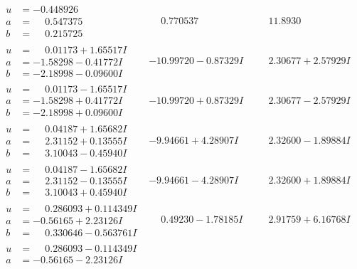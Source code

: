 \documentclass[1p]{elsarticle_modified}
\theoremstyle{definition}
\begin{document}
$$\begin{array}{c|c|c}
\begin{aligned}
u &= -0.448926\phantom{ +0.000000I} \\
a &= \phantom{-}0.547375\phantom{ +0.000000I} \\
b &= \phantom{-}0.215725\phantom{ +0.000000I}\end{aligned}
 & \phantom{-}0.770537\phantom{ +0.000000I} & \phantom{-}11.8930\phantom{ +0.000000I} \\ \hline\begin{aligned}
u &= \phantom{-}0.01173 + 1.65517 I \\
a &= -1.58298 - 0.41772 I \\
b &= -2.18998 - 0.09600 I\end{aligned}
 & -10.99720 - 0.87329 I & \phantom{-}2.30677 + 2.57929 I \\ \hline\begin{aligned}
u &= \phantom{-}0.01173 - 1.65517 I \\
a &= -1.58298 + 0.41772 I \\
b &= -2.18998 + 0.09600 I\end{aligned}
 & -10.99720 + 0.87329 I & \phantom{-}2.30677 - 2.57929 I \\ \hline\begin{aligned}
u &= \phantom{-}0.04187 + 1.65682 I \\
a &= \phantom{-}2.31152 + 0.13555 I \\
b &= \phantom{-}3.10043 - 0.45940 I\end{aligned}
 & -9.94661 + 4.28907 I & \phantom{-}2.32600 - 1.89884 I \\ \hline\begin{aligned}
u &= \phantom{-}0.04187 - 1.65682 I \\
a &= \phantom{-}2.31152 - 0.13555 I \\
b &= \phantom{-}3.10043 + 0.45940 I\end{aligned}
 & -9.94661 - 4.28907 I & \phantom{-}2.32600 + 1.89884 I \\ \hline\begin{aligned}
u &= \phantom{-}0.286093 + 0.114349 I \\
a &= -0.56165 + 2.23126 I \\
b &= \phantom{-}0.330646 - 0.563761 I\end{aligned}
 & \phantom{-}0.49230 - 1.78185 I & \phantom{-}2.91759 + 6.16768 I \\ \hline\begin{aligned}
u &= \phantom{-}0.286093 - 0.114349 I \\
a &= -0.56165 - 2.23126 I \\

\end{aligned}
\end{array}$$
\end{document}
